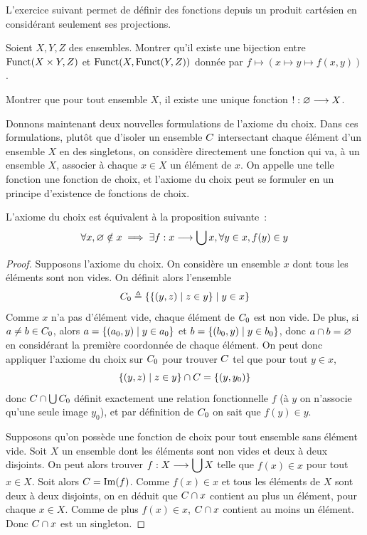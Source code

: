 L'exercice suivant permet de définir des fonctions depuis un produit cartésien
en considérant seulement ses projections.

\begin{exercise}
  Soient $X,Y,Z$ des ensembles. Montrer qu'il existe une bijection entre
  $\operatorname{Funct}(X\times Y,Z)$ et $\operatorname{Funct}(X,\operatorname{Funct}(Y,Z))$ donnée par
  $f\mapsto (x\mapsto y \mapsto f(x,y))$.
\end{exercise}

\begin{exercise}
  Montrer que pour tout ensemble $X$, il existe une unique fonction
  $\mathord{!} : \displaystyle \varnothing \longrightarrow X$.
\end{exercise}

Donnons maintenant deux nouvelles formulations de l'axiome du choix. Dans ces
formulations, plutôt que d'isoler un ensemble $C$ intersectant chaque
élément d'un ensemble $X$ en des singletons, on considère directement une
fonction qui va, à un ensemble $X$, associer à chaque $x \in X$ un élément de
$x$. On appelle une telle fonction une fonction de choix, et l'axiome du choix
peut se formuler en un principe d'existence de fonctions de choix.

\begin{proposition}
  L'axiome du choix est équivalent à la proposition suivante~:
  \[\forall x,
  \varnothing\notin x \implies
  \exists f : \displaystyle x \longrightarrow \bigcup x, \forall y \in x, f(y) \in y\]
\end{proposition}

\begin{proof}
  Supposons l'axiome du choix. On considère un ensemble $x$ dont tous les
  éléments sont non vides. On définit alors l'ensemble
  \[C_0\triangleq \left\{ \left\{ (y,z) \;\middle\vert\; z \in y \right\} \;\middle\vert\; y \in x \right\}\]
  Comme $x$ n'a pas d'élément vide, chaque élément de $C_0$ est non vide.
  De plus, si $a \neq b \in C_0$, alors
  $a = \left\{ (a_0,y) \;\middle\vert\; y \in a_0 \right\}$ et $b = \left\{ (b_0,y) \;\middle\vert\; y \in b_0 \right\}$, donc
  $a\cap b = \varnothing$ en considérant la première coordonnée de chaque élément.
  On peut donc appliquer l'axiome du choix sur
  $C_0$ pour trouver $C$ tel que pour tout $y\in x$,
  \[\left\{ (y,z) \;\middle\vert\; z \in y \right\}\cap C = \{(y,y_0)\}\]
  donc $C\cap \bigcup C_0$ définit exactement une relation
  fonctionnelle $f$ (à $y$ on n'associe qu'une seule image $y_0$), et par
  définition de $C_0$ on sait que $f(y)\in y$.

  Supposons qu'on possède une fonction de choix pour tout ensemble sans élément
  vide. Soit $X$ un ensemble dont les éléments sont non vides et deux à deux
  disjoints. On peut alors trouver $f : \displaystyle X \longrightarrow \bigcup X$ telle que
  $f(x)\in x$ pour tout $x\in X$. Soit alors $C = \operatorname{Im}(f)$. Comme
  $f(x)\in x$ et tous
  les éléments de $X$ sont deux à deux disjoints, on en déduit que
  $C\cap x$ contient au plus un élément, pour chaque $x\in X$. Comme de
  plus $f(x) \in x$, $C\cap x$ contient au moins un élément. Donc
  $C\cap x$ est un singleton.
\end{proof}

